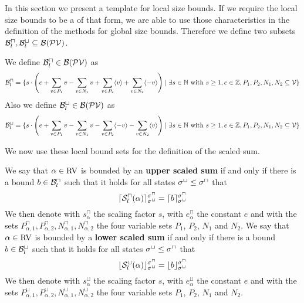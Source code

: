 In this section we present a template for local size bounds.
If we require the local size bounds to be a of that form, we are able to use those characteristics in the definition of the methods for global size bounds.
Therefore we define two subsets $\mathcal{B}^\sqcap_l, \mathcal{B}^\sqcup_l \subseteq \mathcal{B}(\mathcal{PV})$.

\begin{definition}
  We define $\mathcal{B}^\sqcap_l \in \mathcal{B}(\mathcal{PV})$ as 
  \[ \mathcal{B}^\sqcap_l = \lbrace 
    s \cdot \left(
        e
      + \sum_{v \in P_1} v
      - \sum_{v \in N_1} v
      + \sum_{v \in P_2} \langle v\rangle
      + \sum_{v \in N_2} \langle-v\rangle
      \right) \mid \exists s \in \mathbb{N} \text{ with } s \geq 1, e \in \mathbb{Z}, P_1, P_2, N_1, N_2 \subseteq \mathcal{V}  \rbrace\]
  Also we define $\mathcal{B}^\sqcup_l \in \mathcal{B}(\mathcal{PV})$ as 
  \[ \mathcal{B}^\sqcup_l = \lbrace 
    s \cdot \left(
        e
      + \sum_{v \in P_1} v
      - \sum_{v \in N_1} v
      - \sum_{v \in P_2} \langle-v\rangle
      - \sum_{v \in N_2} \langle v\rangle
      \right) \mid \exists s \in \mathbb{N} \text{ with } s \geq 1, e \in \mathbb{Z}, P_1, P_2, N_1, N_2 \subseteq \mathcal{V}  \rbrace\]
\end{definition}

We now use these local bound sets for the definition of the scaled sum.

\begin{definition}
  We say that $\alpha \in \text{RV}$ is bounded by an \textbf{upper scaled sum} if and only if there is a bound $b \in \mathcal{B}^\sqcap_l$ such that it holds for all states ${\sigma^\sqcup} \leq {\sigma^\sqcap}$ that
  \[ \lceil {\mathcal{S}^\sqcap_l}(\alpha) \rceil^{{\sigma^\sqcap}}_{{\sigma^\sqcup}} = \lceil b \rceil^{{\sigma^\sqcap}}_{{\sigma^\sqcup}} \]
  We then denote with $s^\sqcap_\alpha$ the scaling factor $s$, with $e^\sqcap_\alpha$ the constant $e$ and with the sets $P_{\alpha,1}^\sqcap, P_{\alpha,2}^\sqcap, N_{\alpha,1}^\sqcap, N_{\alpha,2}^\sqcap$ the four variable sets $P_1$, $P_2$, $N_1$ and $N_2$.
  We say that $\alpha \in \text{RV}$ is bounded by a \textbf{lower scaled sum} if and only if there is a bound $b \in \mathcal{B}^\sqcup_l$ such that it holds for all states ${\sigma^\sqcup} \leq {\sigma^\sqcap}$ that
  \[ \lfloor {\mathcal{S}^\sqcup_l}(\alpha) \rfloor^{{\sigma^\sqcap}}_{{\sigma^\sqcup}} = \lfloor b \rfloor^{{\sigma^\sqcap}}_{{\sigma^\sqcup}} \]
  We then denote with $s^\sqcup_\alpha$ the scaling factor $s$, with $e^\sqcup_\alpha$ the constant $e$ and with the sets $P_{\alpha,1}^\sqcup, P_{\alpha,2}^\sqcup, N_{\alpha,1}^\sqcup, N_{\alpha,2}^\sqcup$ the four variable sets $P_1$, $P_2$, $N_1$ and $N_2$.
\end{definition}

